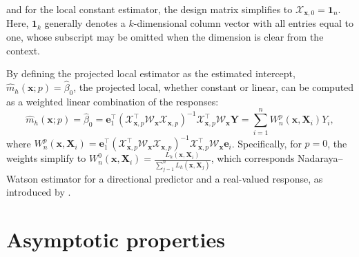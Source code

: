 \documentclass[12pt]{report} %
\newcommand{\bX}{\mathbf{X}}
\newcommand{\bx}{\mathbf{x}}
\newcommand{\bbX}{\boldsymbol{\mathcal{X}}}
\newcommand{\bbW}{\boldsymbol{\mathcal{W}}}
\begin{document}
and for the local constant estimator, the design matrix simplifies to $\bbX_{\bx,0} = \mathbf{1}_n$. Here, $\mathbf{1}_k$ generally denotes a $k$-dimensional column vector with all entries equal to one, whose subscript may be omitted when the dimension is clear from the context.

By defining the projected local estimator as the estimated intercept, $\hat{m}_{h}(\bx;p) = \hat{\beta}_0$, the projected local, whether constant or linear, can be computed as a weighted linear combination of the responses:
\begin{equation}
\label{eq:estimator-weights}
    \hat{m}_{h}(\bx;p) = \hat{\beta}_0 = \mathbf{e}_1^\top \left(\bbX_{\bx,p}^\top \bbW_{\bx} \bbX_{\bx,p}\right)^{-1} \bbX_{\bx,p}^\top \bbW_{\bx} \mathbf{Y} = \sum_{i=1}^n W_n^p(\bx, \bX_i) Y_i,
\end{equation}
where $W_n^p(\bx, \bX_i) = \mathbf{e}_1^\top \left(\bbX_{\bx,p}^\top \bbW_{\bx} \bbX_{\bx,p}\right)^{-1} \bbX_{\bx,p}^\top \bbW_{\bx} \mathbf{e}_i$.  Specifically, for $p =0$, the weights simplify to  $W_n^0 (\bx,\bX_i) = \frac{L_h(\bx,\bX_i)}{\sum_{j = 1}^{n} L_h(\bx,\bX_j)}$, which corresponds Nadaraya--Watson estimator for a directional predictor and a real-valued response, as introduced by \citet{Wang2020}.

\section{Asymptotic properties}


\end{document}
